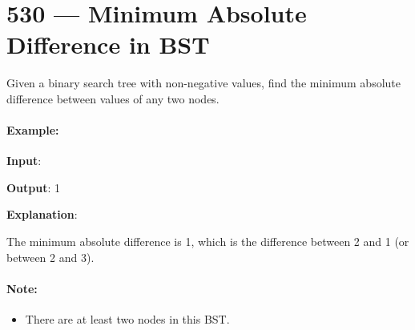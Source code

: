 \section{530 --- Minimum Absolute Difference in BST}
Given a binary search tree with non-negative values, find the minimum absolute difference between values of any two nodes.

\paragraph{Example:}

\begin{flushleft}
\textbf{Input}:

\begin{figure}[H]
\end{figure}


\textbf{Output}:
1


\textbf{Explanation}:

The minimum absolute difference is 1, which is the difference between 2 and 1 (or between 2 and 3).

\end{flushleft} 

\paragraph{Note:} 
\begin{itemize}
\item There are at least two nodes in this BST.
\end{itemize}